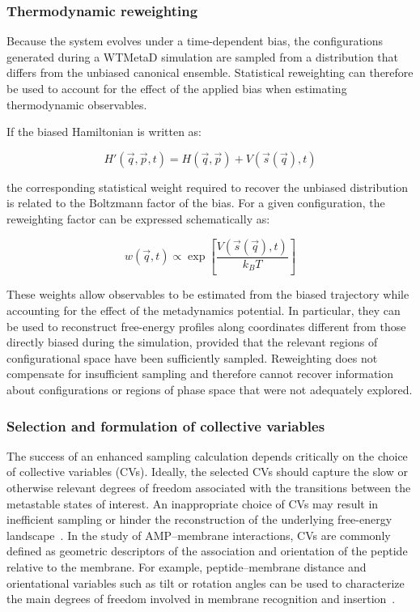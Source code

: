 \subsubsection{Thermodynamic reweighting}

Because the system evolves under a time-dependent bias, the configurations generated during a WTMetaD simulation are sampled from a distribution that differs from the unbiased canonical ensemble. Statistical reweighting can therefore be used to account for the effect of the applied bias when estimating thermodynamic observables.

If the biased Hamiltonian is written as:

\begin{equation}
H'(\vec{q},\vec{p},t)
=
H(\vec{q},\vec{p})
+
V(\vec{s}(\vec{q}),t)
\end{equation}

the corresponding statistical weight required to recover the unbiased distribution is related to the Boltzmann factor of the bias. For a given configuration, the reweighting factor can be expressed schematically as:

\begin{equation}
w(\vec{q},t)
\propto
\exp\left[
\frac{V(\vec{s}(\vec{q}),t)}
{k_B T}
\right]
\end{equation}

These weights allow observables to be estimated from the biased trajectory while accounting for the effect of the metadynamics potential. In particular, they can be used to reconstruct free-energy profiles along coordinates different from those directly biased during the simulation, provided that the relevant regions of configurational space have been sufficiently sampled. Reweighting does not compensate for insufficient sampling and therefore cannot recover information about configurations or regions of phase space that were not adequately explored.



\subsubsection{Selection and formulation of collective variables}

The success of an enhanced sampling calculation depends critically on the choice of collective variables (CVs). Ideally, the selected CVs should capture the slow or otherwise relevant degrees of freedom associated with the transitions between the metastable states of interest. An inappropriate choice of CVs may result in inefficient sampling or hinder the reconstruction of the underlying free-energy landscape~\cite{Bussi2020}. In the study of AMP--membrane interactions, CVs are commonly defined as geometric descriptors of the association and orientation of the peptide relative to the membrane. For example, peptide--membrane distance and orientational variables such as tilt or rotation angles can be used to characterize the main degrees of freedom involved in membrane recognition and insertion~\cite{DANI_METADINAMICA}.

